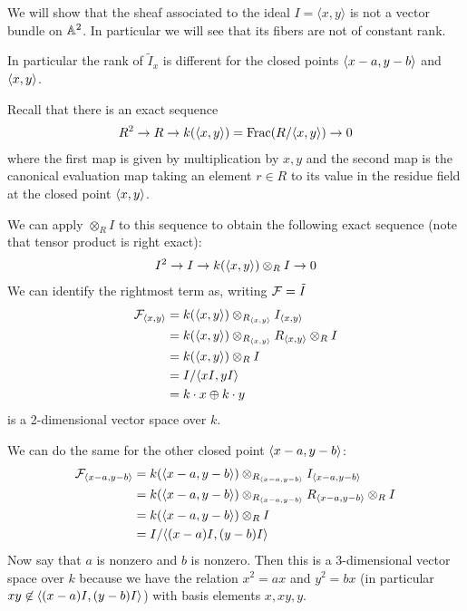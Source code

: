 \documentclass[12pt]{article}
\begin{document}
\begin{example}
    We will show that the sheaf associated to the ideal $I = \langle x,y \rangle$ is not a vector bundle on $\mathbb{A}^2$. In particular we will see that its fibers are not of constant rank.

    In particular the rank of $\tilde I_x$ is different for the closed points $\langle{x-a,y-b}\rangle$ and $\langle{x,y}\rangle$.

    Recall that there is an exact sequence \begin{align*}
        R^2 \to R \to k(\langle{x,y}\rangle) = \text{Frac}(R/\langle{x,y}\rangle) \to 0
    \end{align*} where the first map is given by multiplication by $x,y$ and the second map is the canonical evaluation map taking an element $r\in R$ to its value in the residue field at the closed point $\langle{x,y}\rangle$.

We can apply $\otimes_R I$ to this sequence to obtain the following exact sequence (note that tensor product is right exact):
\begin{align*}
    I^2 \to I \to k(\langle{x,y}\rangle) \otimes_R I \to 0
\end{align*}
We can identify the rightmost term as, writing ${\mathcal{F}} = \tilde I$\begin{align*}
{\mathcal{F}}_{\langle{x,y}\rangle} &= k(\langle{x,y}\rangle) \otimes_{R_{\langle{x,y}\rangle}} I_{\langle{x,y}\rangle} \\
&= k(\langle{x,y}\rangle) \otimes_{R_{\langle{x,y}\rangle}} R_{\langle{x,y}\rangle} \otimes_R I \\
&= k(\langle{x,y}\rangle) \otimes_R I \\
&= I/\langle{xI,yI}\rangle \\
&= k\cdot x \oplus k\cdot y 
\end{align*} is a 2-dimensional vector space over $k$.

We can do the same for the other closed point $\langle{x-a,y-b}\rangle$:
\begin{align*}
    {\mathcal{F}}_{\langle{x-a,y-b}\rangle} &= k(\langle{x-a,y-b}\rangle) \otimes_{R_{\langle{x-a,y-b}\rangle}} I_{\langle{x-a,y-b}\rangle} \\
    &= k(\langle{x-a,y-b}\rangle) \otimes_{R_{\langle{x-a,y-b}\rangle}} R_{\langle{x-a,y-b}\rangle} \otimes_R I \\
    &= k(\langle{x-a,y-b}\rangle) \otimes_R I \\
    &= I/\langle{(x-a)I,(y-b)I}\rangle 
\end{align*}
Now say that $a$ is nonzero and $b$ is nonzero. Then this is a $3$-dimensional vector space over $k$ because we have the relation $x^2 = ax$ and $y^2 = bx$ (in particular $xy\not\in \langle{(x-a)I,(y-b)I}\rangle$) with basis elements $x,xy,y$.
\end{example}
\end{document}
